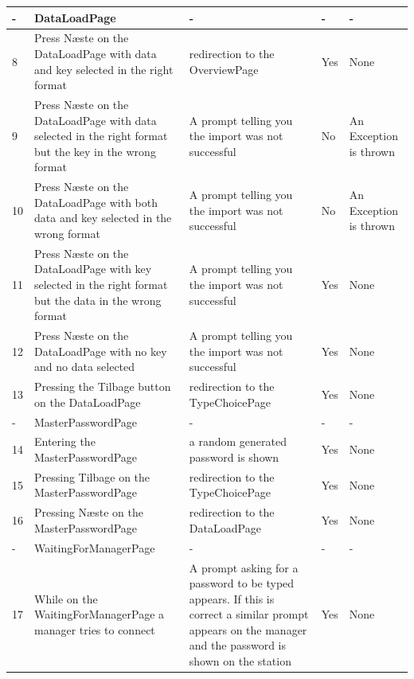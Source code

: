 \documentclass[a4paper]{report}
\begin{document}
\begin{longtable}{|p{5mm}|p{}|p{}|p{}|p{}|}
\\\hline
- & DataLoadPage & - & - & -

\\\hline
8 & Press N\ae ste on the DataLoadPage with data and key selected in the right format & redirection to the OverviewPage & Yes & None 

\\\hline
9 & Press N\ae ste on the DataLoadPage with data selected in the right format but the key in the wrong format & A prompt telling you the import was not successful & No & An Exception is thrown

\\\hline
10 & Press N\ae ste on the DataLoadPage with both data  and key selected in the wrong format & A prompt telling you the import was not successful & No & An Exception is thrown

\\\hline
11 & Press N\ae ste on the DataLoadPage with key selected in the right format but the data in the wrong format & A prompt telling you the import was not successful & Yes & None

\\\hline
12 & Press N\ae ste on the DataLoadPage with no key and no data selected & A prompt telling you the import was not successful & Yes & None

\\\hline
13 & Pressing the Tilbage button on the DataLoadPage & redirection to the TypeChoicePage & Yes & None

 \\\hline
- & MasterPasswordPage & - & - & - 

\\\hline
14 & Entering the MasterPasswordPage & a random generated password is shown & Yes & None

\\\hline
15 & Pressing Tilbage on the MasterPasswordPage & redirection to the TypeChoicePage & Yes & None 

\\\hline
16 & Pressing N\ae ste on the MasterPasswordPage  & redirection to the DataLoadPage & Yes & None 

\\\hline
- & WaitingForManagerPage & - & - & - 

 \\\hline
17 & While on the WaitingForManagerPage a manager tries to connect & A prompt asking for a password to be typed appears. If this is correct a similar prompt appears on the manager and the password is shown on the station & Yes & None 


\end{longtable}
\end{document}
